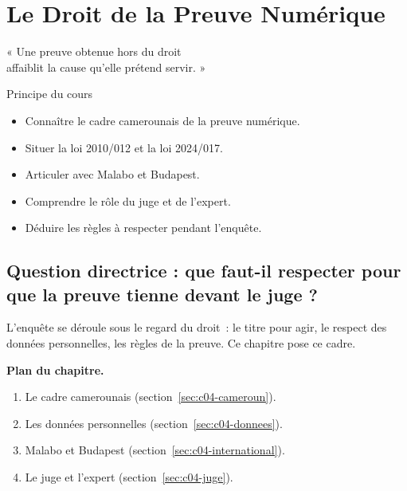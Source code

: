 
\chapter{Le Droit de la Preuve Numérique}
\label{chap:droit}

\epigraph{%
    « Une preuve obtenue hors du droit\\
    affaiblit la cause qu'elle prétend servir. »%
}{Principe du cours}


\begin{boxobjectifs}
\begin{itemize}
    \item Connaître le cadre camerounais de la preuve numérique.
    \item Situer la loi 2010/012 et la loi 2024/017.
    \item Articuler avec Malabo et Budapest.
    \item Comprendre le rôle du juge et de l'expert.
    \item Déduire les règles à respecter pendant l'enquête.
\end{itemize}
\end{boxobjectifs}

\bigskip

\section*{Question directrice : que faut-il respecter pour que la preuve tienne devant le juge ?}

L'enquête se déroule sous le regard du droit~: le titre pour agir, le respect
des données personnelles, les règles de la preuve. Ce chapitre pose ce cadre.

\medskip
\textbf{Plan du chapitre.}
\begin{enumerate}
    \item Le cadre camerounais (section~\ref{sec:c04-cameroun}).
    \item Les données personnelles (section~\ref{sec:c04-donnees}).
    \item Malabo et Budapest (section~\ref{sec:c04-international}).
    \item Le juge et l'expert (section~\ref{sec:c04-juge}).
\end{enumerate}

